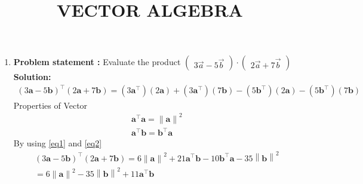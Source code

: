 \documentclass[12pt]{article}\usepackage{graphicx}
\title{\mytitle}
\newcommand{\myvec}[1]{\ensuremath{\begin{pmatrix}#1\end{pmatrix}}}
\let\vec\mathbf
\let\vec\mathbf
\providecommand{\norm}[1]{\left\lVert#1\right\rVert}
\providecommand{\brak}[1]{\ensuremath{\left(#1\right)}}
\newcommand{\solution}{\noindent \textbf{Solution: }}
\begin{document}
\begin{center}
\title{\textbf{VECTOR ALGEBRA}}
\maketitle
\end{center}
\begin{enumerate}
\item\textbf{Problem statement :} Evaluate the product $\myvec{3\overrightarrow{a}-5\overrightarrow{b}}\cdot\myvec{2\overrightarrow{a}+7\overrightarrow{b}}$
\solution
\begin{align}
    \brak{3\vec{a}-5\vec{b}}^{\top}\brak{2\vec{a}+7\vec{b}}= \brak{3\vec{a}^{\top}}\brak{2\vec{a}}+\brak{3\vec{a}^{\top}}\brak{7\vec{b}}-\brak{5\vec{b}^{\top}}\brak{2\vec{a}}-\brak{5\vec{b}^{\top}}\brak{7\vec{b}}
\end{align}
Properties of Vector
\begin{align}
    \vec{a}^{\top}\vec{a} = \norm{\vec{a}}^2
    \label{eq1}  
    \\
    \vec{a}^{\top}\vec{b} = \vec{b}^{\top}\vec{a}
    \label{eq2}
\end{align}
By using \eqref{eq1} and \eqref{eq2}
\begin{align}
    \brak{3\vec{a}-5\vec{b}}^{\top}\brak{2\vec{a}+7\vec{b}} = 6\norm{\vec{a}}^2 +21\vec{a}^{\top}\vec{b}-10\vec{b}^{\top}\vec{a}-35\norm{\vec{b}}^2 \\
     =6\norm{\vec{a}}^2-35\norm{\vec{b}}^2+11\vec{a}^{\top}\vec{b}
\end{align}
\end{enumerate}
\end{document}
